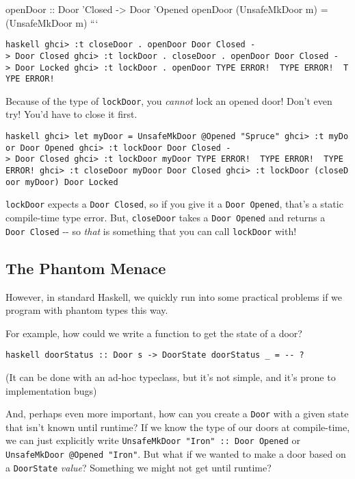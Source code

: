 \documentclass[]{article}
\begin{document}
openDoor :: Door 'Closed -\textgreater{} Door 'Opened openDoor (UnsafeMkDoor m)
= (UnsafeMkDoor m) ```

\texttt{haskell\ ghci\textgreater{}\ :t\ closeDoor\ .\ openDoor\ Door\ \textquotesingle{}Closed\ -\textgreater{}\ Door\ \textquotesingle{}Closed\ ghci\textgreater{}\ :t\ lockDoor\ .\ closeDoor\ .\ openDoor\ Door\ \textquotesingle{}Closed\ -\textgreater{}\ Door\ \textquotesingle{}Locked\ ghci\textgreater{}\ :t\ lockDoor\ .\ openDoor\ TYPE\ ERROR!\ \ TYPE\ ERROR!\ \ TYPE\ ERROR!}

Because of the type of \texttt{lockDoor}, you \emph{cannot} lock an opened door!
Don't even try! You'd have to close it first.

\texttt{haskell\ ghci\textgreater{}\ let\ myDoor\ =\ UnsafeMkDoor\ @\textquotesingle{}Opened\ "Spruce"\ ghci\textgreater{}\ :t\ myDoor\ Door\ \textquotesingle{}Opened\ ghci\textgreater{}\ :t\ lockDoor\ Door\ \textquotesingle{}Closed\ -\textgreater{}\ Door\ \textquotesingle{}Closed\ ghci\textgreater{}\ :t\ lockDoor\ myDoor\ TYPE\ ERROR!\ \ TYPE\ ERROR!\ \ TYPE\ ERROR!\ ghci\textgreater{}\ :t\ closeDoor\ myDoor\ Door\ \textquotesingle{}Closed\ ghci\textgreater{}\ :t\ lockDoor\ (closeDoor\ myDoor)\ Door\ \textquotesingle{}Locked}

\texttt{lockDoor} expects a \texttt{Door\ \textquotesingle{}Closed}, so if you
give it a \texttt{Door\ \textquotesingle{}Opened}, that's a static compile-time
type error. But, \texttt{closeDoor} takes a
\texttt{Door\ \textquotesingle{}Opened} and returns a
\texttt{Door\ \textquotesingle{}Closed} -\/- so \emph{that} is something that
you can call \texttt{lockDoor} with!

\subsection{The Phantom Menace}

However, in standard Haskell, we quickly run into some practical problems if we
program with phantom types this way.

For example, how could we write a function to get the state of a door?

\texttt{haskell\ doorStatus\ ::\ Door\ s\ -\textgreater{}\ DoorState\ doorStatus\ \_\ =\ -\/-\ ?}

(It can be done with an ad-hoc typeclass, but it's not simple, and it's prone to
implementation bugs)

And, perhaps even more important, how can you create a \texttt{Door} with a
given state that isn't known until runtime? If we know the type of our doors at
compile-time, we can just explicitly write
\texttt{UnsafeMkDoor\ "Iron"\ ::\ Door\ \textquotesingle{}Opened} or
\texttt{UnsafeMkDoor\ @\textquotesingle{}Opened\ "Iron"}. But what if we wanted
to make a door based on a \texttt{DoorState} \emph{value}? Something we might
not get until runtime?
\end{document}
